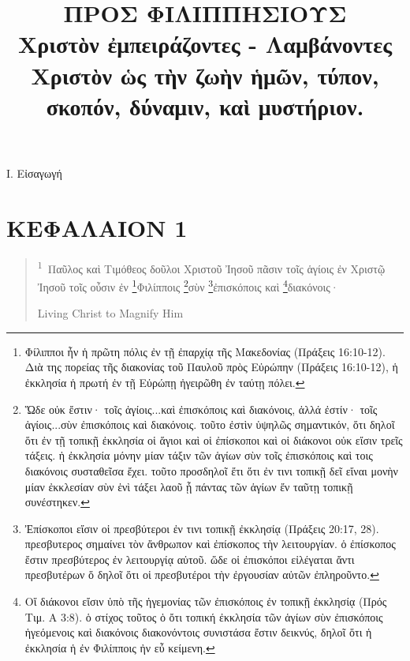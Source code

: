\documentclass{article}
\newcommand{\currentverse}{1} %
\newcommand{\setcurrentverse}[1]{\renewcommand{\currentverse}{#1}}
\newcounter{versecounter}
\newcommand{\newverse}{%
  \stepcounter{versecounter}%
  \setcounter{footnote}{0}%
}
\renewcommand{\thefootnote}{\textsuperscript{\theversecounter\textsuperscript{\arabic{footnote}}}}
\begin{document}

\newcommand{\versenum}[1]{%
  \newverse%
  \textbf{\textcolor{verseblue}{#1}}
}

\renewcommand{\thefootnote}{\textcolor{footnoteblue}{\arabic{footnote}}}

\title{ΠΡΟΣ ΦΙΛΙΠΠΗΣΙΟΥΣ\\[1ex] \Large Χριστὸν ἐμπειράζοντες - Λαμβάνοντες Χριστὸν ὡς τὴν ζωὴν ἡμῶν, τύπον, σκοπόν, δύναμιν, καὶ μυστήριον.}
\date{}
\maketitle
Ι. Εἰσαγωγή

\section*{ΚΕΦΑΛΑΙΟΝ 1}

\begin{verse}

\setcurrentverse{1}

\setcounter{footnote}{0}

\textsuperscript{1}~Παῦλος καὶ Τιμόθεος δοῦλοι Χριστοῦ Ἰησοῦ πᾶσιν τοῖς ἁγίοις ἐν Χριστῷ Ἰησοῦ τοῖς οὖσιν ἐν \footnote{Φίλιπποι ἦν ἡ πρῶτη πόλις ἐν τῇ ἐπαρχίᾳ τῆς Μακεδονίας (Πράξεις 16:10-12). Διὰ της πορείας τῆς διακονίας τοῦ Παυλοῦ πρὸς Εὐρώπην (Πράξεις 16:10-12), ἡ ἐκκλησία ἡ πρωτή ἐν τῇ Εὐρώπῃ ἠγειρῶθη ἐν ταύτῃ πόλει.}Φιλίπποις \footnote{
    Ὥδε οὐκ ἔστιν· τοῖς ἁγίοις...καὶ ἐπισκόποις καὶ διακόνοις, ἀλλά ἐστίν· τοῖς ἁγίοις...σὺν ἐπισκόποις καὶ διακόνοις. τοῦτο ἐστὶν ὑψηλῶς σημαντικόν, ὅτι δηλοῖ ὅτι ἐν τῇ τοπικῇ ἐκκλησία οἱ ἅγιοι καὶ οἱ ἐπίσκοποι καὶ οἱ διάκονοι οὐκ εἴσιν τρεῖς τάξεις. ἡ ἐκκλησία μόνην μίαν τάξιν τῶν ἁγίων σὺν τοῖς ἐπισκόποις καὶ τοις διακόνοις συσταθεῖσα ἔχει. τοῦτο προσδηλοῖ ἔτι ὅτι ἐν τινι τοπικῇ δεῖ εἴναι μονὴν μίαν ἐκκλεσίαν σὺν ἑνὶ τάξει λαοῦ ᾗ πάντας τῶν ἁγίων ἔν ταῦτῃ τοπικῇ συνέστηκεν.
    }σὺν \footnote{Ἐπίσκοποι εἴσιν οἱ πρεσβύτεροι ἐν τινι τοπικῇ ἐκκλησίᾳ (Πράξεις 20:17, 28). πρεσβυτερος σημαίνει τὸν ἄνθρωπον καὶ ἐπίσκοπος τὴν λειτουργίαν. ὁ ἐπίσκοπος ἔστιν πρεσβύτερος ἐν λειτουργίᾳ αὐτοῦ. ὥδε οἱ ἐπισκόποι εἰλέγαται ἄντι πρεσβυτέρων ὅ δηλοῖ ὅτι οἱ πρεσβυτέροι τὴν ἐργουσίαν αὐτῶν ἐπληροῦντο.}ἐπισκόποις καὶ \footnote{Οἵ διάκονοι εἴσιν ὑπὸ τῆς ἡγεμονίας τῶν ἐπισκόποις ἐν τοπικῇ ἐκκλησίᾳ (Πρός Τιμ. Α 3:8). ὁ στίχος τοῦτος ὁ ὄτι τοπική ἐκκλησία τῶν ἁγίων σὺν ἐπισκόποις ἡγεόμενοις καὶ διακόνοις διακονόντοις συνιστάσα ἔστιν δεικνύς, δηλοῖ ὅτι ἡ ἐκκλησία ἡ ἐν Φιλίπποις ἠν εὖ κείμενη.}διακόνοις·

Living Christ to Magnify Him

\end{verse}
\end{document}
